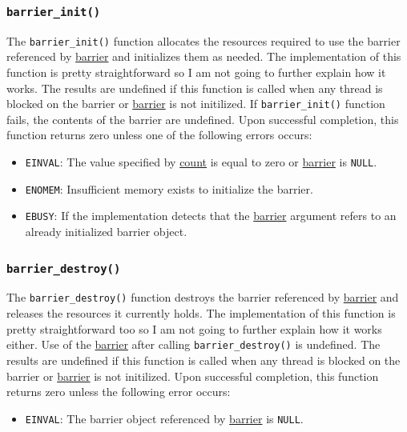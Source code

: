 \documentclass{article}
\def\code#1{\texttt{#1}}
\begin{document}
\subsubsection{\code{barrier\_init()}}
The \code{barrier\_init()} function allocates the resources required to use the barrier
referenced by \underline{barrier} and initializes them as needed. The implementation of
this function is pretty straightforward so I am not going to further explain how it works.
The results are undefined if this function is called when any thread is blocked on the
barrier or \underline{barrier} is not initilized. If \code{barrier\_init()} function fails,
the contents of the barrier are undefined. Upon successful completion, this function returns
zero unless one of the following errors occurs:
\begin{itemize}
 \item \code{EINVAL}: The value specified by \underline{count} is equal to zero or
       \underline{barrier} is \code{NULL}.
 \item \code{ENOMEM}: Insufficient memory exists to initialize the barrier.
 \item \code{EBUSY}: If the implementation detects that the \underline{barrier} argument
       refers to an already initialized barrier object.
\end{itemize}

\subsubsection{\code{barrier\_destroy()}}
The \code{barrier\_destroy()} function destroys the barrier referenced by \underline{barrier}
and releases the resources it currently holds. The implementation of this function is pretty
straightforward too so I am not going to further explain how it works either. Use of the
\underline{barrier} after calling \code{barrier\_destroy()} is undefined. The results are
undefined if this function is called when any thread is blocked on the barrier or
\underline{barrier} is not initilized. Upon successful completion, this function returns
zero unless the following error occurs:
\begin{itemize}
 \item \code{EINVAL}: The barrier object referenced by \underline{barrier} is \code{NULL}.
\end{itemize}
\end{document}
